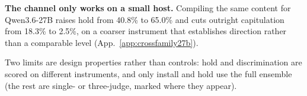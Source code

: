 \textbf{The channel only works on a small host.} Compiling the same content for
Qwen3.6-27B raises hold from 40.8\% to 65.0\% and cuts outright capitulation from 18.3\% to
2.5\%, on a coarser instrument that establishes direction rather than a comparable level
(App.~\ref{app:crossfamily27b}).

Two limits are design properties rather than controls: hold and discrimination are scored on
different instruments, and only install and hold use the full ensemble (the rest are single- or
three-judge, marked where they appear).

